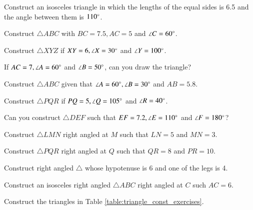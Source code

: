 \item Construct an isosceles triangle in which the lengths of the equal sides is 6.5 and the angle between them is $110\degree$.
\item Construct $\triangle ABC$  with $BC = 7.5, AC = 5$ and $\angle C = 60\degree$.
\item Construct $\triangle XYZ$ if $XY = 6, \angle X = 30\degree$ and $\angle Y = 100 \degree$.
\item If $AC = 7, \angle A = 60\degree$ and $\angle B = 50 \degree$, can you draw the triangle?
\item Construct $\triangle ABC$ given that $\angle A = 60\degree, \angle B = 30\degree$ and $AB = 5.8$.
\item Construct $\triangle PQR$ if $PQ = 5, \angle Q = 105 \degree$ and $\angle R = 40 \degree$.
\item Can you construct $\triangle DEF$ such that $EF = 7.2, \angle E = 110\degree$ and $\angle F = 180\degree$?
\item Construct  $\triangle LMN$ right angled at $M$ such that $LN = 5$ and $MN = 3$.
 \\
 \solution

\item Construct  $\triangle PQR$ right angled at $Q$ such that $QR = 8$ and $PR = 10$.
\\
\solution

\item Construct  right angled $\triangle $ whose hypotenuse  is 6 and one of the legs is 4.
\\
\solution


\item Construct  an isosceles right angled $\triangle ABC$ right angled at $C$ such $AC = 6$.
\\
\solution


\item Construct the  triangles in Table \ref{table:triangle_const_exercises}.
\begin{table}[!ht]
\centering

\caption{}
\label{table:triangle_const_exercises}
\end{table}

%
